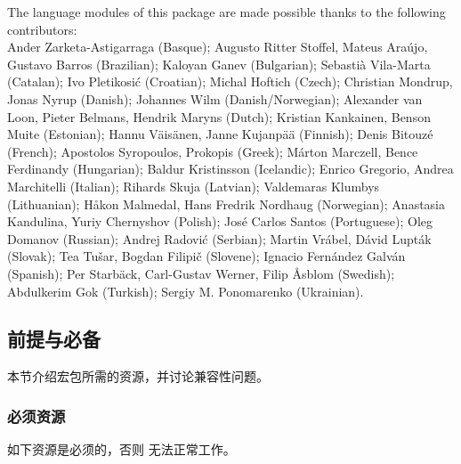 The language modules of this package are made possible thanks to the following contributors:\\
Ander Zarketa-Astigarraga (Basque);
Augusto Ritter Stoffel, Mateus Araújo, Gustavo Barros (Brazilian);
Kaloyan Ganev (Bulgarian);
Sebastià Vila-Marta (Catalan);
Ivo Pletikosić (Croatian);
Michal Hoftich (Czech);
Christian Mondrup, Jonas Nyrup (Danish);
Johannes Wilm (Danish\slash Norwegian);
Alexander van Loon, Pieter Belmans, Hendrik Maryns (Dutch);
Kristian Kankainen, Benson Muite (Estonian);
Hannu Väisänen, Janne Kujanpää (Finnish);
Denis Bitouzé (French);
Apostolos Syropoulos, Prokopis (Greek);
Márton Marczell, Bence Ferdinandy (Hungarian);
Baldur Kristinsson (Icelandic);
Enrico Gregorio, Andrea Marchitelli (Italian);
Rihards Skuja (Latvian);
Valdemaras Klumbys (Lithuanian);
Håkon Malmedal, Hans Fredrik Nordhaug (Norwegian);
Anastasia Kandulina, Yuriy Chernyshov (Polish);
José Carlos Santos (Portuguese);
Oleg Domanov (Russian);
Andrej Radović (Serbian);
Martin Vrábel, Dávid Lupták (Slovak);
Tea Tušar, Bogdan Filipič (Slovene);
Ignacio Fernández Galván (Spanish);
Per Starbäck, Carl-Gustav Werner, Filip Åsblom (Swedish);
Abdulkerim Gok (Turkish);
Sergiy M. Ponomarenko (Ukrainian).


\subsection{前提与必备}
\label{int:pre}

本节介绍宏包所需的资源，并讨论兼容性问题。

\subsubsection{必须资源}
\label{int:pre:req}


如下资源是必须的，否则 \biblatex 无法正常工作。


